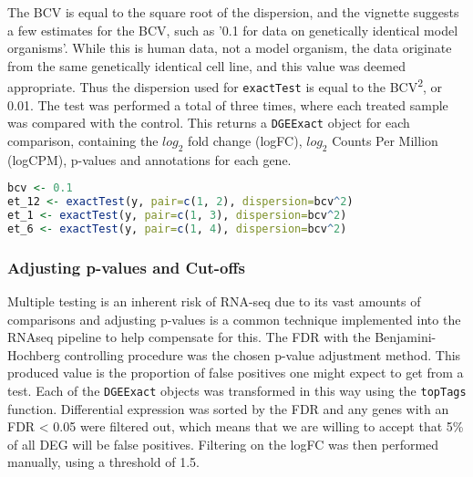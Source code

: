 The \ac{BCV} is equal to the square root of the dispersion, and the vignette suggests a few estimates for the \ac{BCV}, such as '0.1 for data on genetically identical model organisms'. While this is human data, not a model organism, the data originate from the same genetically identical cell line, and this value was deemed appropriate. Thus the dispersion used for \texttt{exactTest} is equal to the BCV\textsuperscript{2}, or 0.01. 
The test was performed a total of three times, where each treated sample was compared with the control. This returns a \texttt{DGEExact} object for each comparison, containing the $log_{2}$ fold change (logFC), $log_{2}$ Counts Per Million (logCPM), p-values and annotations for each gene. 

\begin{lstlisting}[language=R, caption=Exact test function]
bcv <- 0.1
et_12 <- exactTest(y, pair=c(1, 2), dispersion=bcv^2)
et_1 <- exactTest(y, pair=c(1, 3), dispersion=bcv^2)
et_6 <- exactTest(y, pair=c(1, 4), dispersion=bcv^2)
\end{lstlisting}


\subsubsection{Adjusting p-values and Cut-offs}

Multiple testing is an inherent risk of RNA-seq due to its vast amounts of comparisons and adjusting p-values is a common technique implemented into the RNAseq pipeline to help compensate for this.  The \ac{FDR} with the Benjamini-Hochberg controlling procedure was the chosen p-value adjustment method. This produced value is the proportion of false positives one might expect to get from a test. Each of the \texttt{DGEExact} objects was transformed in this way using the \texttt{topTags} function. Differential expression was sorted by the \ac{FDR} and any genes with an \ac{FDR} < 0.05 were filtered out, which means that we are willing to accept that 5\% of all \ac{DEG} will be false positives. Filtering on the logFC was then performed manually, using a threshold of 1.5.  


